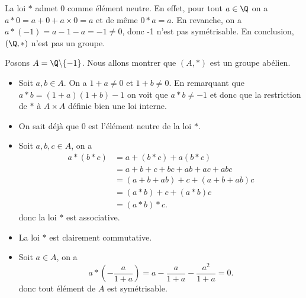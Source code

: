 La loi $*$ admet $0$ comme élément neutre. En effet, pour tout $a\in\Q$ on
a $a*0 = a+0+a\times 0 = a$ et de même $0*a = a$. En revanche, on a $a*(-1) =
a-1-a = -1\neq 0$, donc -1 n'est pas symétrisable. En conclusion, $(\Q,*)$
n'est pas un groupe.

\begin{remarque}
Posons $A = \Q\backslash\{-1\}$. Nous allons montrer que $(A,*)$ est un groupe
abélien.

\begin{itemize}
\item Soit $a,b\in A$. On a $1+a \neq 0$ et $1+b \neq 0$. En remarquant que
$a*b = (1+a)(1+b) - 1$ on voit que $a*b \neq -1$ et donc que la restriction de
$*$ à $A \times A$ définie bien une loi interne.

\item On sait déjà que $0$ est l'élément neutre de la loi $*$.

\item Soit $a,b,c\in A$, on a
\begin{align*}
a*(b*c)& = a+(b*c)+a(b*c)\\
       & = a+b+c+bc+ab+ac+abc\\
       & = (a+b+ab)+c+(a+b+ab)c\\
       & = (a*b)+c+(a*b)c\\
       & = (a*b)*c.
\end{align*}
donc la loi $*$ est associative.

\item La loi $*$ est clairement commutative.

\item Soit $a\in A$, on a
\[ 
  a*\left(-\frac{a}{1+a}\right) = a-\frac{a}{1+a}-\frac{a^2}{1+a} = 0.
\]
donc tout élément de $A$ est symétrisable.

\end{itemize}
\end{remarque}
